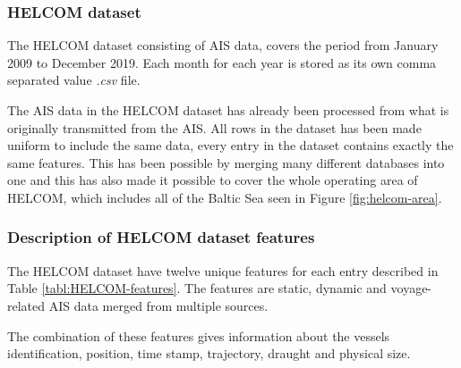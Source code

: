 \documentclass[../main.tex]{subfiles}
\begin{document}
\subsubsection{HELCOM dataset}

The HELCOM dataset consisting of AIS data, covers the period from January 2009 to December 2019. Each month for each year is stored as its own comma separated value \textit{.csv} file.

The AIS data in the HELCOM dataset has already been processed from what is originally transmitted from the AIS. All rows in the dataset has been made uniform to include the same data, every entry in the dataset contains exactly the same features. This has been possible by merging many different databases into one and this has also made it possible to cover the whole operating area of HELCOM, which includes all of the Baltic Sea seen in Figure \ref{fig:helcom-area}.

%
%


\subsubsection{Description of HELCOM dataset features}

The HELCOM dataset have twelve unique features for each entry described in Table \ref{tabl:HELCOM-features}. The features are static, dynamic and voyage-related AIS data merged from multiple sources.

The combination of these features gives information about the vessels identification, position, time stamp, trajectory, draught and physical size. 
\end{document}
